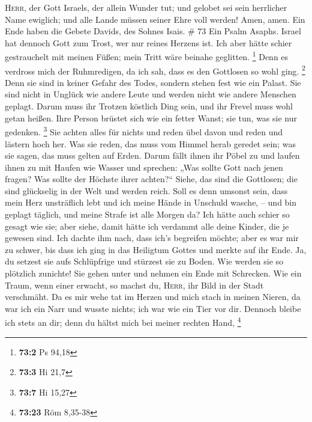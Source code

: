 \textsc{Herr}, der Gott Israels, der allein Wunder tut; 
und gelobet sei sein herrlicher Name ewiglich; und alle Lande müssen
seiner Ehre voll werden! Amen, amen.  Ein Ende haben die
Gebete Davids, des Sohnes Isais. \# 73  Ein Psalm Asaphs.
Israel hat dennoch Gott zum Trost, wer nur reines Herzens ist.
 Ich aber hätte schier gestrauchelt mit meinen Füßen; mein
Tritt wäre beinahe geglitten. \footnote{\textbf{73:2} Ps 94,18}
 Denn es verdross mich der Ruhmredigen, da ich sah, dass
es den Gottlosen so wohl ging. \footnote{\textbf{73:3} Hi 21,7}
 Denn sie sind in keiner Gefahr des Todes, sondern stehen
fest wie ein Palast.  Sie sind nicht in Unglück wie andere
Leute und werden nicht wie andere Menschen geplagt.  Darum
muss ihr Trotzen köstlich Ding sein, und ihr Frevel muss wohl getan
heißen.  Ihre Person brüstet sich wie ein fetter Wanst;
sie tun, was sie nur gedenken. \footnote{\textbf{73:7} Hi 15,27}
 Sie achten alles für nichts und reden übel davon und
reden und lästern hoch her.  Was sie reden, das muss vom
Himmel herab geredet sein; was sie sagen, das muss gelten auf Erden.
 Darum fällt ihnen ihr Pöbel zu und laufen ihnen zu mit
Haufen wie Wasser  und sprechen: „Was sollte Gott nach
jenen fragen? Was sollte der Höchste ihrer achten?{}`` 
Siehe, das sind die Gottlosen; die sind glückselig in der Welt und
werden reich.  Soll es denn umsonst sein, dass mein Herz
unsträflich lebt und ich meine Hände in Unschuld wasche, --
 und bin geplagt täglich, und meine Strafe ist alle
Morgen da?  Ich hätte auch schier so gesagt wie sie; aber
siehe, damit hätte ich verdammt alle deine Kinder, die je gewesen sind.
 Ich dachte ihm nach, dass ich's begreifen möchte; aber
es war mir zu schwer,  bis dass ich ging in das Heiligtum
Gottes und merkte auf ihr Ende.  Ja, du setzest sie aufs
Schlüpfrige und stürzest sie zu Boden.  Wie werden sie so
plötzlich zunichte! Sie gehen unter und nehmen ein Ende mit Schrecken.
 Wie ein Traum, wenn einer erwacht, so machst du,
\textsc{Herr}, ihr Bild in der Stadt verschmäht.  Da es
mir wehe tat im Herzen und mich stach in meinen Nieren, 
da war ich ein Narr und wusste nichts; ich war wie ein Tier vor dir.
 Dennoch bleibe ich stets an dir; denn du hältst mich bei
meiner rechten Hand, \footnote{\textbf{73:23} Röm 8,35-38}

